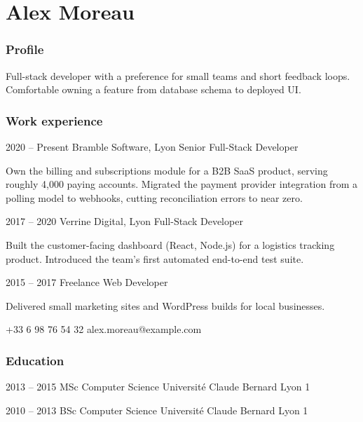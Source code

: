 \documentclass[fontsize=10pt]{tccv}
\begin{document}
\part{Alex Moreau}

\section{Profile}

Full-stack developer with a preference for small teams and short
feedback loops. Comfortable owning a feature from database schema to
deployed UI.

\section{Work experience}

\begin{eventlist}

\item{2020 -- Present}
     {Bramble Software, Lyon}
     {Senior Full-Stack Developer}

Own the billing and subscriptions module for a B2B SaaS product,
serving roughly 4{,}000 paying accounts. Migrated the payment
provider integration from a polling model to webhooks, cutting
reconciliation errors to near zero.

\item{2017 -- 2020}
     {Verrine Digital, Lyon}
     {Full-Stack Developer}

Built the customer-facing dashboard (React, Node.js) for a logistics
tracking product. Introduced the team's first automated end-to-end
test suite.

\item{2015 -- 2017}
     {Freelance}
     {Web Developer}

Delivered small marketing sites and WordPress builds for local
businesses.

\end{eventlist}

    {+33 6 98 76 54 32}
    {alex.moreau@example.com}

\section{Education}

\begin{yearlist}

\item{2013 -- 2015}
     {MSc Computer Science}
     {Universit\'e Claude Bernard Lyon 1}

\item{2010 -- 2013}
     {BSc Computer Science}
     {Universit\'e Claude Bernard Lyon 1}

\end{yearlist}
\end{document}
